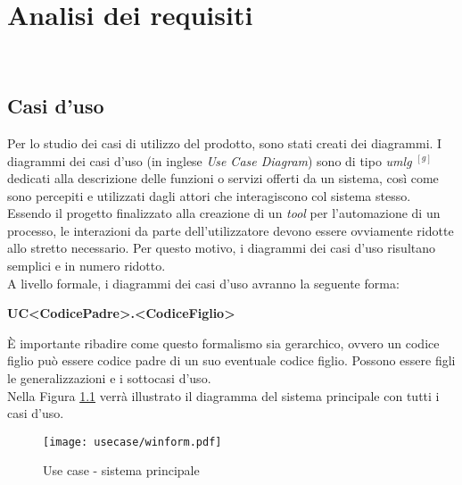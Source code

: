 
\chapter{Analisi dei requisiti}
\label{cap:analisi-requisiti}

\noindent {}\\

\section{Casi d'uso}

\noindent Per lo studio dei casi di utilizzo del prodotto, sono stati creati dei diagrammi.
I diagrammi dei casi d'uso \cite{siteE:wiki} (in inglese \emph{\textit{Use Case} Diagram}) sono di tipo \textit{\gls{umlg}} $^{[g]}$ dedicati alla descrizione delle funzioni o servizi offerti da un sistema, così come sono percepiti e utilizzati dagli attori che interagiscono col sistema stesso.
Essendo il progetto finalizzato alla creazione di un \textit{tool} per l'automazione di un processo, le interazioni da parte dell'utilizzatore devono essere ovviamente ridotte allo stretto necessario. Per questo motivo, i diagrammi dei casi d'uso risultano semplici e in numero ridotto.\\

\noindent A livello formale, i diagrammi dei casi d'uso avranno la seguente forma:
\begin{center}
    \textbf{UC<CodicePadre>.<CodiceFiglio>}
\end{center}
\noindent È importante ribadire come questo formalismo sia gerarchico, ovvero un codice figlio
può essere codice padre di un suo eventuale codice figlio. Possono essere figli le generalizzazioni e i sottocasi d'uso.\\

\noindent Nella Figura \ref{use-case-sistema-principale} verrà illustrato il diagramma del sistema principale con tutti i casi d'uso.
\vspace*{\fill}
\begin{figure}[!h] 
   \centering 
   \texttt{[image: usecase/winform.pdf]} 
   \caption{Use case - sistema principale}
   \label{use-case-sistema-principale}
\end{figure}
\vspace*{\fill}


